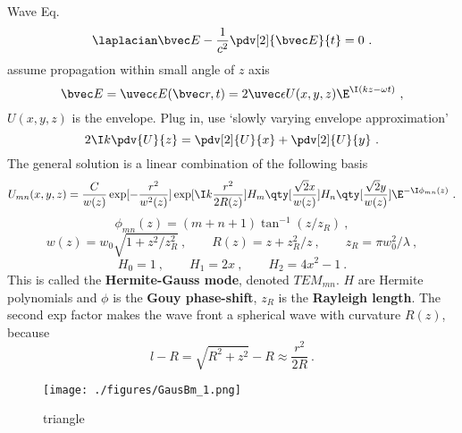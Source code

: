 
\begin{issues}
\issueDraft
\issueMissDepend
{}
\end{issues}


Wave Eq.
\begin{equation}
\laplacian \bvec E - \frac{1}{c^2} \pdv[2]{\bvec E}{t} = 0~.
\end{equation}
assume propagation within small angle of $z$ axis
\begin{equation}
\bvec E = \uvec \epsilon E(\bvec r, t) = 2\uvec \epsilon U(x, y, z) \E^{\I (kz - \omega t)}~,
\end{equation}
$U(x, y, z)$ is the envelope. Plug in, use ‘slowly varying envelope approximation’
\begin{equation}
2\I k\pdv{U}{z} = \pdv[2]{U}{x} + \pdv[2]{U}{y}~.
\end{equation}
The general solution is a linear combination of the following basis
\begin{equation}
U_{mn}(x, y, z) = \frac{C}{w(z)} \exp[-\frac{r^2}{w^2(z)}]\exp[\I k\frac{r^2}{2R(z)}] H_m\qty[\frac{\sqrt{2}x}{w(z)}] H_n \qty[\frac{\sqrt{2} y}{w(z)}] \E^{-\I \phi_{mn}(z)}~.
\end{equation}
\begin{equation}
\phi_{mn}(z) = (m+n+1)\tan^{-1}(z/z_R)~,
\end{equation}
\begin{equation}
w(z) = w_0\sqrt{1 + z^2/z_R^2}~,
\qquad
R(z) = z + z_R^2 / z~,
\qquad
z_R = \pi w_0^2 / \lambda~,
\end{equation}
\begin{equation}
H_0 = 1 ~,\qquad H_1 = 2x~, \qquad H_2 = 4x^2 - 1~.
\end{equation}
This is called the \textbf{Hermite-Gauss mode}, denoted $TEM_{mn}$. $H$ are Hermite polynomials and $\phi$ is the \textbf{Gouy phase-shift}, $z_R$ is the \textbf{Rayleigh length}. The second exp factor makes the wave front a spherical wave with curvature $R(z)$, because
\begin{equation}
l - R = \sqrt{R^2 + z^2} - R \approx \frac{r^2}{2R}~.
\end{equation}

\begin{figure}[ht]
\centering
\texttt{[image: ./figures/GausBm\_1.png]}
\caption{triangle} \label{GausBm_fig1}
\end{figure}

